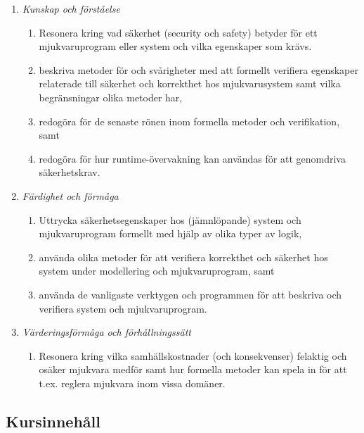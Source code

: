 \begin{enumerate}
\def\labelenumi{\Alph{enumi}.}
\tightlist
\item
  \emph{Kunskap och förståelse}

  \begin{enumerate}
  \def\labelenumii{\Alph{enumi}.\arabic{enumii}.}
  \tightlist
  \item
    Resonera kring vad säkerhet (security och safety) betyder för ett
    mjukvaruprogram eller system och vilka egenskaper som krävs.
  \item
    beskriva metoder för och svårigheter med att formellt verifiera
    egenskaper relaterade till säkerhet och korrekthet hos
    mjukvarusystem samt vilka begränsningar olika metoder har,
  \item
    redogöra för de senaste rönen inom formella metoder och
    verifikation, samt
  \item
    redogöra för hur runtime-övervakning kan användas för att genomdriva
    säkerhetskrav.
  \end{enumerate}
\item
  \emph{Färdighet och förmåga}

  \begin{enumerate}
  \def\labelenumii{\Alph{enumi}.\arabic{enumii}.}
  \tightlist
  \item
    Uttrycka säkerhetsegenskaper hos (jämnlöpande) system och
    mjukvaruprogram formellt med hjälp av olika typer av logik,
  \item
    använda olika metoder för att verifiera korrekthet och säkerhet hos
    system under modellering och mjukvaruprogram, samt
  \item
    använda de vanligaste verktygen och programmen för att beskriva och
    verifiera system och mjukvaruprogram.
  \end{enumerate}
\item
  \emph{Värderingsförmåga och förhållningssätt}

  \begin{enumerate}
  \def\labelenumii{\Alph{enumi}.\arabic{enumii}.}
  \tightlist
  \item
    Resonera kring vilka samhällskostnader (och konsekvenser) felaktig
    och osäker mjukvara medför samt hur formella metoder kan spela in
    för att t.ex. reglera mjukvara inom vissa domäner.
  \end{enumerate}
\end{enumerate}

\subsection*{Kursinnehåll}

